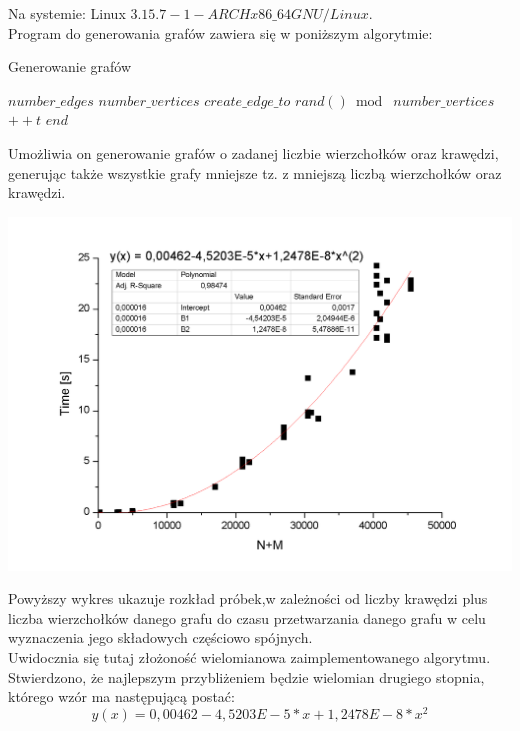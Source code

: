 \documentclass[a4paper,10pt]{article}
\begin{document}
Na systemie: Linux $3.15.7-1-ARCH x86\_64 GNU/Linux.$ \\

Program do generowania grafów zawiera się w poniższym algorytmie:

\begin{algorithm}
\caption{Generowanie grafów}
\begin{algorithmic}
\State $number\_edges$
\State $number\_vertices$
    	\State $create\_edge\_to$ $rand()\bmod\; number\_vertices$
    	  \State $++t $
    	  \State $end $    	  
	  \EndIf      	  
	  \EndIf  
	\EndFor
\EndFor
\EndWhile
\EndFunction
\end{algorithmic}
\end{algorithm}

Umożliwia on generowanie grafów o zadanej liczbie wierzchołków oraz krawędzi, generując także wszystkie grafy mniejsze tz. z mniejszą liczbą wierzchołków oraz krawędzi.

\includegraphics[width=12 cm]{Graph1}


Powyższy wykres ukazuje rozkład próbek,w zależności od liczby krawędzi plus liczba wierzchołków danego grafu do czasu przetwarzania danego grafu w celu wyznaczenia jego składowych częściowo spójnych.\\

Uwidocznia się tutaj złożoność wielomianowa zaimplementowanego algorytmu. Stwierdzono, że najlepszym przybliżeniem będzie wielomian drugiego stopnia, którego wzór ma następującą postać:
$$
y(x) = 0,00462-4,5203E-5*x+1,2478E-8*x^2
$$
\end{document}
